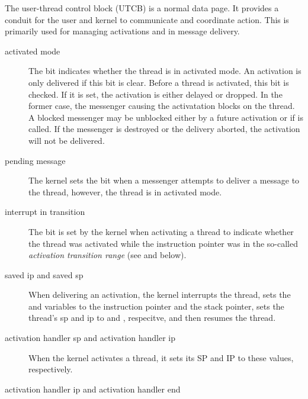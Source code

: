 The user-thread control block (UTCB) is a normal data page.  It
provides a conduit for the user and kernel to communicate and
coordinate action.  This is primarily used for managing activations
and in message delivery.

\begin{description}

\item[activated mode]

The  bit indicates whether the thread is in
activated mode.  An activation is only delivered if this bit is clear.
Before a thread is activated, this bit is checked.  If it is set, the
activation is either delayed or dropped.  In the former case, the
messenger causing the activatation blocks on the thread.  A blocked
messenger may be unblocked either by a future activation or if
 is called.  If the messenger is
destroyed or the delivery aborted, the activation will not be
delivered.

\item[pending message]

The kernel sets the  bit when a messenger
attempts to deliver a message to the thread, however, the thread is in
activated mode.

\item[interrupt in transition]

The  bit is set by the kernel when
activating a thread to indicate whether the thread was activated while
the instruction pointer was in the so-called \emph{activation
  transition range} (see  and
 below).

\item[saved ip \textmd{and} saved sp]

When delivering an activation, the kernel interrupts the thread, sets
the  and  variables to the instruction
pointer and the stack pointer, sets the thread's sp and ip to
 and ,
respecitve, and then resumes the thread.

\item[activation handler sp \textmd{and} activation handler ip]

When the kernel activates a thread, it sets its SP and IP to these
values, respectively.

\item[activation handler ip \textmd{and} activation handler end]


\end{description}
